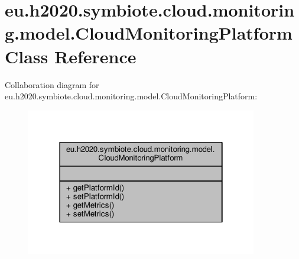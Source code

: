 \hypertarget{classeu_1_1h2020_1_1symbiote_1_1cloud_1_1monitoring_1_1model_1_1CloudMonitoringPlatform}{}\section{eu.\+h2020.\+symbiote.\+cloud.\+monitoring.\+model.\+Cloud\+Monitoring\+Platform Class Reference}
\label{classeu_1_1h2020_1_1symbiote_1_1cloud_1_1monitoring_1_1model_1_1CloudMonitoringPlatform}


Collaboration diagram for eu.\+h2020.\+symbiote.\+cloud.\+monitoring.\+model.\+Cloud\+Monitoring\+Platform\+:
\nopagebreak
\begin{figure}[H]
\begin{center}
\leavevmode
\includegraphics[width=286pt]{classeu_1_1h2020_1_1symbiote_1_1cloud_1_1monitoring_1_1model_1_1CloudMonitoringPlatform__coll__graph}
\end{center}
\end{figure}

